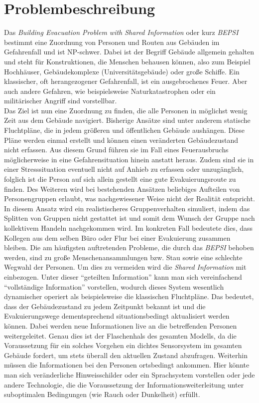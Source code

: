 \documentclass[a4paper, 11pt]{scrreprt}
\begin{document}
\chapter{Problembeschreibung}
Das \textit{Building Evacuation Problem with Shared Information} oder kurz \textit{BEPSI}
bestimmt eine Zuordnung von Personen und Routen aus Gebäuden im Gefahrenfall und ist NP-schwer.
Dabei ist der Begriff Gebäude allgemein gehalten und steht für Konstruktionen, die
Menschen behausen können, also zum Beispiel Hochhäuser, Gebäudekomplexe (Universitätsgebäude)
oder große Schiffe. Ein klassischer, oft herangezogener Gefahrenfall, ist ein
ausgebrochenes Feuer. Aber auch andere Gefahren, wie beispielsweise Naturkatastrophen oder
ein militärischer Angriff sind vorstellbar.\\
Das Ziel ist nun eine Zuordnung zu finden, die alle Personen in möglichst wenig Zeit aus dem
Gebäude navigiert. Bisherige Ansätze sind unter anderem statische Fluchtpläne, die in jedem
größeren und öffentlichen Gebäude aushängen. Diese Pläne werden einmal erstellt und können
einen veränderten Gebäudezustand nicht erfassen. Aus diesem Grund führen sie im Fall eines
Feuerausbruchs möglicherweise in eine Gefahrensituation hinein anstatt heraus. Zudem
sind sie in einer Stresssituation eventuell nicht auf Anhieb zu erfassen oder unzugänglich,
folglich ist die Person
auf sich allein gestellt eine gute Evakuierungsroute zu finden. Des Weiteren wird bei
bestehenden Ansätzen beliebiges Aufteilen von Personengruppen erlaubt, was nachgewiesener Weise
nicht der Realität entspricht.\\
In diesem Ansatz wird ein realistischeres Gruppenverhalten simuliert, indem das Splitten von
Gruppen nicht gestattet ist und somit dem Wunsch der Gruppe nach kollektivem Handeln nachgekommen wird.
Im konkreten Fall bedeutete dies, dass Kollegen aus dem selben Büro oder Flur bei einer Evakuierung
zusammen bleiben. Die am häufigsten auftretenden Probleme, die durch das \textit{BEPSI} behoben
werden, sind zu große Menschenansammlungen bzw. Stau sowie eine schlechte Wegwahl der Personen.
Um dies zu vermeiden wird die \textit{Shared Information} mit einbezogen. Unter dieser
``geteilten Information'' kann man sich vereinfachend ``vollständige Information'' vorstellen,
wodurch dieses System wesentlich dynamischer operiert als beispielsweise die klassischen Fluchtpläne.
Das bedeutet, dass der Gebäudezustand zu jedem Zeitpunkt bekannt ist und die Evakuierungswege
dementsprechend situationsbedingt aktualisiert werden können. Dabei werden neue Informationen live
an die betreffenden Personen weitergeleitet. Genau dies ist der Flaschenhals des gesamten Modells,
da die Voraussetzung für ein solches Vorgehen ein dichtes Sensorsystem im gesamten Gebäude fordert,
um stets überall den aktuellen Zustand abzufragen. Weiterhin müssen die Informationen bei den
Personen ortsbedingt ankommen. Hier könnte man sich veränderliche Hinweisschilder oder ein
Sprachsystem vorstellen oder jede andere Technologie, die die Voraussetzung der
Informationsweiterleitung unter suboptimalen Bedingungen (wie Rauch oder Dunkelheit) erfüllt.
\end{document}
